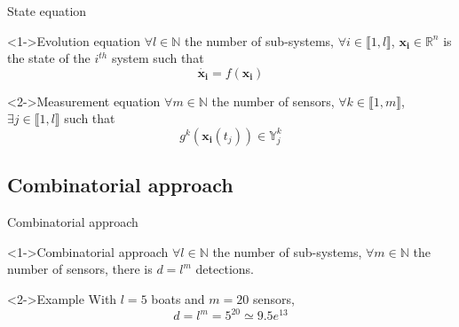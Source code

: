 \documentclass{beamer}
\begin{document}
            \begin{frame}{State equation}
                \begin{block}<1->{Evolution equation}
                    $\forall l \in \mathbb{N}$ the number of sub-systems, $\forall i \in \llbracket 1, l\rrbracket$, $\mathbf{x_i} \in \mathbb{R}^n$ is the state of the $i^{th}$ system such that
                    \begin{equation}
                        \dot{\mathbf{x_i}} = f(\mathbf{x_i})
                    \end{equation}
                \end{block}

                \begin{block}<2->{Measurement equation}
                    $\forall m \in \mathbb{N}$ the number of sensors, $\forall k \in \llbracket 1, m\rrbracket$, $\exists j \in \llbracket 1, l\rrbracket$ such that
                    \begin{equation}
                        g^k(\mathbf{x_i}(t_j)) \in \mathbb{Y}_j^k
                    \end{equation}
                \end{block}
            \end{frame}

        \subsection{Combinatorial approach}

            \begin{frame}{Combinatorial approach}
                \begin{block}<1->{Combinatorial approach}
                    $\forall l \in \mathbb{N}$ the number of sub-systems, $\forall m \in \mathbb{N}$ the number of sensors, there is $d = l^m$ detections.
                \end{block}
                \begin{exampleblock}<2->{Example}
                    With $l = 5$ boats and $m = 20$ sensors,
                    $$d = l^m = 5^{20} \simeq 9.5e^{13}$$
                \end{exampleblock}
            \end{frame}
\end{document}
